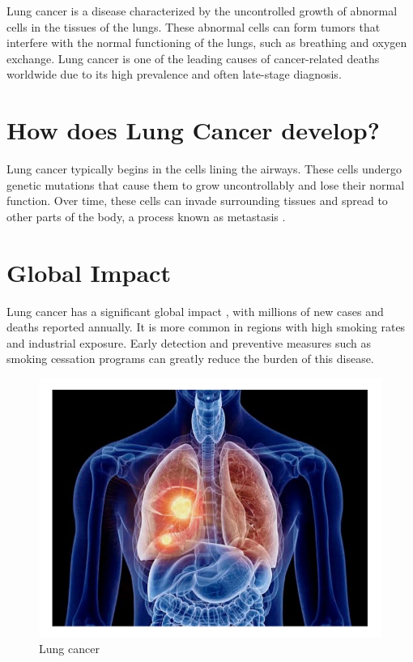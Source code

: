 Lung cancer is a disease characterized by the uncontrolled growth of abnormal cells in the tissues of the lungs. These abnormal cells can form tumors that interfere with the normal functioning of the lungs, such as breathing and oxygen exchange. Lung cancer is one of the leading causes of cancer-related deaths worldwide due to its high prevalence and often late-stage diagnosis.

\section{How does Lung Cancer develop?}
\begin{remark}
Lung cancer \cite{li2024gut} typically begins in the cells lining the airways. These cells undergo genetic mutations that cause them to grow uncontrollably and lose their normal function. Over time, these cells can invade surrounding tissues and spread to other parts of the body, a process known as metastasis \cite{shi2024mechanism}.
\end{remark}

\section{Global Impact}
\begin{outline}
Lung cancer has a significant global impact \cite{ramamoorthy2024assessing}, with millions of new cases and deaths reported annually. It is more common in regions with high smoking rates and industrial exposure. Early detection and preventive measures such as smoking cessation programs can greatly reduce the burden of this disease.
\end{outline}

\begin{figure}[h!]
    \centering
    \includegraphics[width= 0.85\linewidth]{images/lung_c.jpeg}
    \caption{Lung cancer}
    \label{fig:enter-label}
\end{figure}